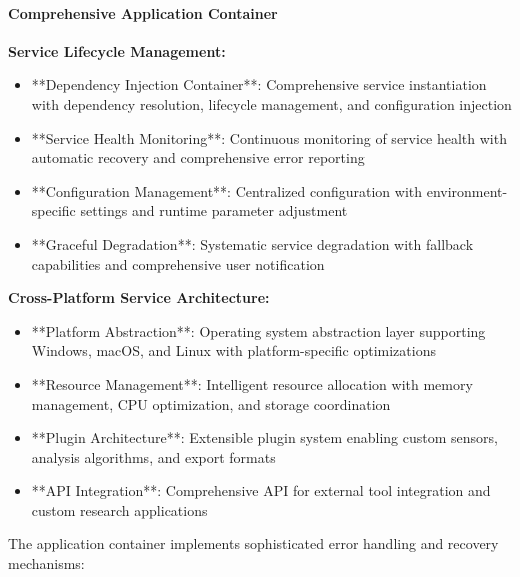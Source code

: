 \documentclass[12pt,a4paper]{report}
\begin{document}
\paragraph{Comprehensive Application Container}

\textbf{Service Lifecycle Management:}

\begin{itemize}
\item **Dependency Injection Container**: Comprehensive service instantiation with dependency resolution, lifecycle
  management, and configuration injection
\item **Service Health Monitoring**: Continuous monitoring of service health with automatic recovery and comprehensive error
  reporting
\item **Configuration Management**: Centralized configuration with environment-specific settings and runtime parameter
  adjustment
\item **Graceful Degradation**: Systematic service degradation with fallback capabilities and comprehensive user
  notification

\end{itemize}
\textbf{Cross-Platform Service Architecture:}

\begin{itemize}
\item **Platform Abstraction**: Operating system abstraction layer supporting Windows, macOS, and Linux with
  platform-specific optimizations
\item **Resource Management**: Intelligent resource allocation with memory management, CPU optimization, and storage
  coordination
\item **Plugin Architecture**: Extensible plugin system enabling custom sensors, analysis algorithms, and export formats
\item **API Integration**: Comprehensive API for external tool integration and custom research applications

\end{itemize}
The application container implements sophisticated error handling and recovery mechanisms:
\end{document}
